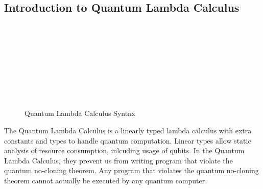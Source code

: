 \subsection{Introduction to Quantum Lambda Calculus}
\begin{figure}[t]
    \begin{syntax}
            \\
            \alternative{!\tau}
            
            \\
            \\
            \\
            \\
            \\
            \\
    \end{syntax}
\caption{Quantum Lambda Calculus Syntax}
\label{fig:qcalc_syntax}
\end{figure}

The Quantum Lambda Calculus is a linearly typed lambda calculus with extra constants and types to handle quantum computation. 
Linear types allow static analysis of resource consumption, inlcuding usage of qubits.
In the Quantum Lambda Calculus, they prevent us from writing program that violate the quantum no-cloning theorem.
Any program that violates the quantum no-cloning theorem cannot actually be executed by any quantum computer.

